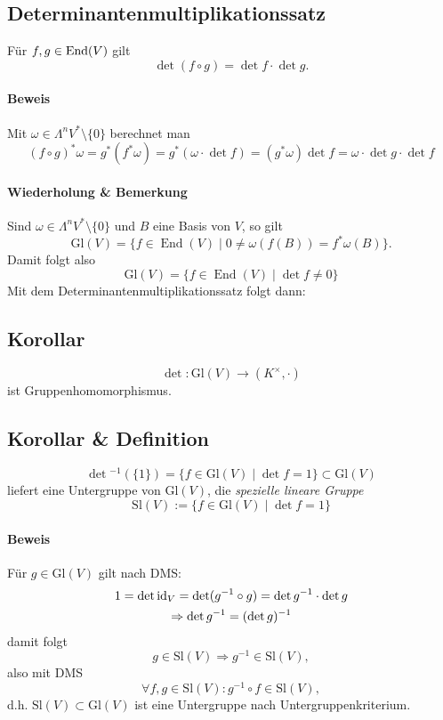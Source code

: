  \subsection{Determinantenmultiplikationssatz}
 	\begin{Satz}[Determinantenmultiplikationssatz]
 		Für $ f,g\in \operatorname{End}(V) $ gilt
 		\[
 			\det(f\circ g) = \det f \cdot \det g.
 		\]
 	\end{Satz}
 	\paragraph{Beweis}
 		Mit $ \omega\in\Lambda^nV^*\setminus\{0\} $ berechnet man
 		\[
 			(f\circ g)^*\omega = g^*(f^*\omega) = g^*(\omega\cdot \det f) = (g^*\omega)\det f = \omega \cdot \det g\cdot \det f
 		\]

 	\paragraph{Wiederholung \& Bemerkung}
 		Sind $ \omega\in \Lambda^nV^*\setminus \{0\} $ und $ B $ eine Basis von $ V $, so gilt
 		\[
 			\mathrm{Gl}(V) = \{f\in \operatorname{End}(V)\mid 0\neq \omega(f(B))=f^*\omega(B)\}.
 		\]
 		Damit folgt also
 		\[
 			\mathrm{Gl}(V) = \{f\in\operatorname{End}(V)\mid \det f \neq 0\}
 		\]
 		Mit dem Determinantenmultiplikationssatz folgt dann:
 \subsection{Korollar}
 	\begin{Korollar}
 		\[
 			\det : \mathrm{Gl}(V)\to (K^\times,\cdot)
 		\]
 		ist Gruppenhomomorphismus.
 	\end{Korollar}
 \subsection{Korollar \& Definition}
 	\begin{Definition}
 		\[
 			\det\text{}^{-1}(\{1\}) = \{f\in \mathrm{Gl}(V)\mid \det f = 1\} \subset \mathrm{Gl}(V)
 		\]
 		liefert eine Untergruppe von $ \mathrm{Gl}(V) $, die \emph{spezielle lineare Gruppe}
 		\[
 			\mathrm{Sl}(V):= \{f\in \mathrm{Gl}(V)\mid \det f = 1 \}
 		\]
 	\end{Definition}
 	\paragraph{Beweis}
 		Für $ g\in \mathrm{Gl}(V) $ gilt nach DMS:
 		\begin{gather*}
 			1 = \det \operatorname{id}_V = \det(g^{-1}\circ g) = \det g^{-1}\cdot \det g \\
 			\Rightarrow \det g^{-1} = (\det g)^{-1}
 		\end{gather*}
 		damit folgt
 		\[
 			g\in \mathrm{Sl}(V)\Rightarrow g^{-1} \in \mathrm{Sl}(V),
 		\]
 		also mit DMS
 		\[
 			\forall f,g\in \mathrm{Sl}(V):g^{-1}\circ f\in \mathrm{Sl}(V),
 		\]
 		d.h. $ \mathrm{Sl}(V)\subset \mathrm{Gl}(V) $ ist eine Untergruppe nach Untergruppenkriterium.
